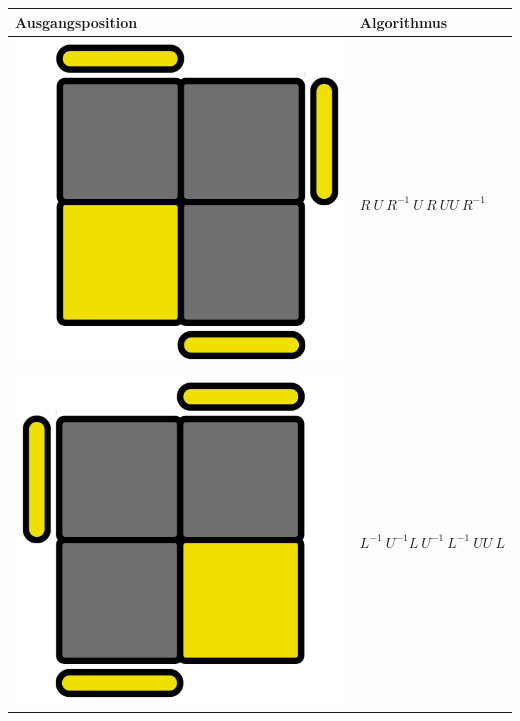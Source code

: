 \documentclass[12pt,a4paper, usenames, dvipsnames]{article}
\theoremstyle{mystyle}
\theoremstyle{definition}
\begin{document}
\begin{center}
\begin{tabular}{m{4cm} m{6cm}}
\toprule
Ausgangsposition & Algorithmus  \\
\midrule

\includegraphics[scale=0.08]{TOPVIEW3_1.png} & $R \ U \ R^{-1} \ U \ R \ UU \ R^{-1}$ \\
\includegraphics[scale=0.08]{TOPVIEW3_2.png} & $L^{-1} \ U^{-1} L \ U^{-1} \ L^{-1} \ UU \ L$ \\

\end{tabular}
\end{center}
\end{document}
